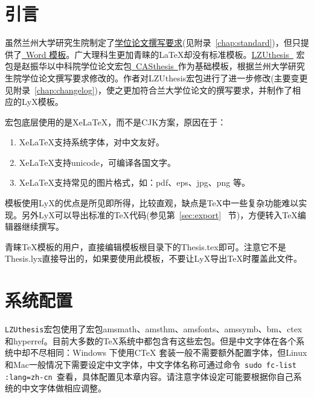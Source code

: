 \documentclass[twoside,longtitle]{LZUthesis}
\begin{document}
\tableofcontents{}


\mainmatter

\pagestyle{lzu}


\chapter{引言\label{chap:intro}}

虽然兰州大学研究生院制定了\href{http://ge.lzu.edu.cn/degree/xwsq/lwgf/201103/1186.htm}{学位论文撰写要求}(见附录~\ref{chap:standard})，但只提供了\href{http://ge.lzu.edu.cn/degree/xwsq/lwgf/201103/1187.htm}{~Word 模板}。广大理科生更加青睐的\LaTeX{}却没有标准模板。\href{http://blog.sciencenet.cn/home.php?mod=space&uid=117412&do=blog&id=512804}{LZUthesis~} 宏包是赵振华以中科院学位论文宏包\href{http://www.ctex.org/PackageCASthesis}{~CASthesis~}作为基础模板，根据兰州大学研究生院学位论文撰写要求修改的。作者对LZUthesis宏包进行了进一步修改(主要变更见附录~\ref{chap:changelog})，使之更加符合兰大学位论文的撰写要求，并制作了相应的LyX模板。

宏包底层使用的是Xe\LaTeX{}，而不是CJK方案，原因在于：
\begin{enumerate}
\item Xe\LaTeX{}支持系统字体，对中文友好。
\item Xe\LaTeX{}支持unicode，可编译各国文字。
\item Xe\LaTeX{}支持常见的图片格式，如：pdf、eps、jpg、png 等。
\end{enumerate}


模板使用LyX的优点是所见即所得，比较直观，缺点是\TeX{}中一些复杂功能难以实现。另外LyX可以导出标准的\TeX{}代码(参见第~\ref{sec:export}~ 节)，方便转入\TeX{}编辑器继续撰写。

青睐\TeX{}模板的用户，直接编辑模板根目录下的Thesis.tex即可。注意它不是Thesis.lyx直接导出的，如果要使用此模板，不要让LyX导出\TeX{}时覆盖此文件。


\chapter{系统配置}

\texttt{LZUthesis}宏包使用了宏包amsmath、amsthm、amsfonts、amssymb、bm、ctex 和hyperref。目前大多数的\TeX{}系统中都包含有这些宏包。但是中文字体在各个系统中却不尽相同：Windows 下使用C\TeX{} 套装一般不需要额外配置字体，但Linux 和Mac一般情况下需要设定中文字体，中文字体名称可通过命令~\lstinline!sudo fc-list :lang=zh-cn!~查看，具体配置见本章内容。请注意字体设定可能要根据你自己系统的中文字体做相应调整。
\end{document}

